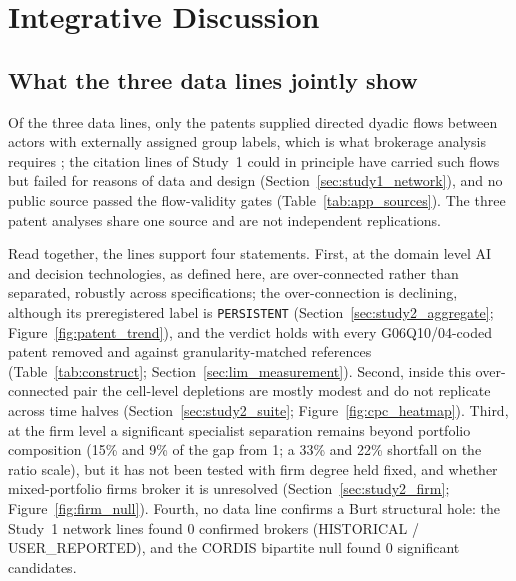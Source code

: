 
\section{Integrative Discussion}
\label{sec:discussion}

\subsection{What the three data lines jointly show}
\label{sec:discussion_lines}

Of the three data lines, only the patents supplied directed dyadic flows between actors with externally assigned group labels, which is what brokerage analysis requires \citep{gould1989structures}; the citation lines of Study~1 could in principle have carried such flows but failed for reasons of data and design (Section~\ref{sec:study1_network}), and no public source passed the flow-validity gates (Table~\ref{tab:app_sources}). The three patent analyses share one source and are not independent replications.

Read together, the lines support four statements. First, at the domain level AI and decision technologies, as defined here, are over-connected rather than separated, robustly across specifications; the over-connection is declining, although its preregistered label is \texttt{PERSISTENT} (Section~\ref{sec:study2_aggregate}; Figure~\ref{fig:patent_trend}), and the verdict holds with every G06Q10/04-coded patent removed and against granularity-matched references (Table~\ref{tab:construct}; Section~\ref{sec:lim_measurement}). Second, inside this over-connected pair the cell-level depletions are mostly modest and do not replicate across time halves (Section~\ref{sec:study2_suite}; Figure~\ref{fig:cpc_heatmap}). Third, at the firm level a significant specialist separation remains beyond portfolio composition (15\% and 9\% of the gap from 1; a 33\% and 22\% shortfall on the ratio scale), but it has not been tested with firm degree held fixed, and whether mixed-portfolio firms broker it is unresolved (Section~\ref{sec:study2_firm}; Figure~\ref{fig:firm_null}). Fourth, no data line confirms a Burt structural hole: the Study~1 network lines found 0 confirmed brokers (HISTORICAL / USER\_REPORTED), and the CORDIS bipartite null found 0 significant candidates.

